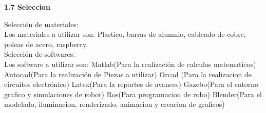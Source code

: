 \documentclass[12pt,letterpaper]{report}
\begin{document}
\begin{flushleft}
\begin{flushleft}
\begin{flushleft}
\begin{flushleft}
\begin{flushleft}
\begin{flushleft}
\begin{flushleft}
\begin{flushleft}
\begin{flushleft}
\begin{flushleft}
\begin{flushleft}
\begin{flushleft}
\begin{flushleft}
\begin{flushleft}
\begin{flushleft}
\begin{flushleft}
\begin{flushleft}
\begin{flushleft}
\begin{flushleft}
\begin{flushleft}
\end{flushleft}
\begin{flushleft}
\textbf{1.7 Seleccion}
\begin{flushleft}
Selección de materiales:\\
Los materiales a utilizar son: Plastico, barras de alumnio, cableado de cobre, poleas de acero, raspberry.\\
Selección de softwares:\\
Los software a utilizar son:
Matlab(Para la realización de calculos matematicos)
Autocad(Para la realización de Piezas a utilizar)
Orcad (Para la realizacion de circuitos electrónico)
Latex(Para la reportes de avances)
Gazebo(Para el entorno grafico y simulaciones de robot)
Ros(Para programacion de robo)
Blender(Para el modelado, iluminacion, renderizado, animacion y creacion de graficos) 

\end{flushleft}
\end{flushleft}



\end{flushleft}
\end{flushleft}



\end{flushleft}
\end{flushleft}
\end{flushleft}
\end{flushleft}
\end{flushleft}
\end{flushleft}
\end{flushleft}
\end{flushleft}
\end{flushleft}
\end{flushleft}
\end{flushleft}
\end{flushleft}


\end{flushleft}
\end{flushleft}
\end{flushleft}
\end{flushleft}
\end{flushleft}


		
\end{document}
